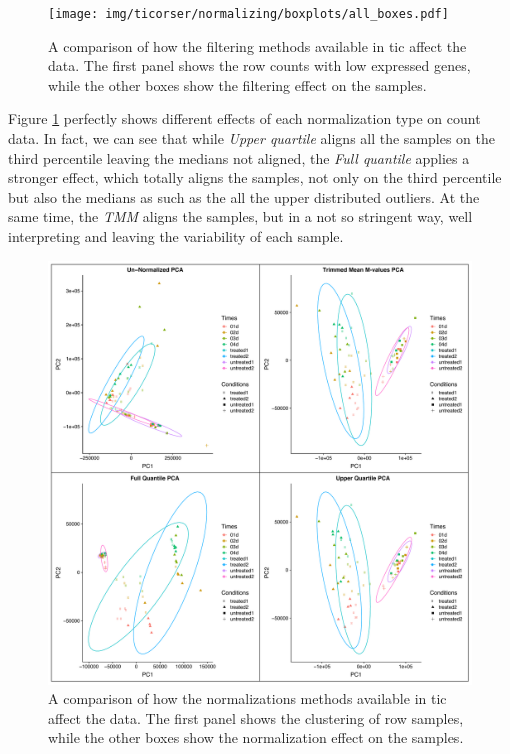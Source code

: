\begin{figure}[H]
\texttt{[image: img/ticorser/normalizing/boxplots/all\_boxes.pdf]}
\caption[ticorser normalizing methods]{A comparison of how the filtering methods available in \gls{tic} affect the data.
The first panel shows the row counts with low expressed genes, while the other boxes show the filtering effect on the samples.}
\label{fig:ticorsernormalizingbox}
\centering
\end{figure}

Figure \ref{fig:ticorsernormalizingbox} perfectly shows different effects of each normalization type on count data.  
In fact, we can see that while \textit{Upper quartile} aligns all the samples on the third percentile leaving the medians not aligned, the \textit{Full quantile} applies a stronger effect, which totally aligns the samples, not only on the third percentile but also the medians as such as the all the upper distributed outliers.
At the same time, the \textit{TMM} aligns the samples, but in a not so stringent way, well interpreting and leaving the variability of each sample.

\begin{figure}[H]
\includegraphics[width=12cm,keepaspectratio]{img/ticorser/normalizing/pca/all_pca.pdf}
\caption[ticorser normalizing methods]{A comparison of how the normalizations methods available in \gls{tic} affect the data.
The first panel shows the clustering of row samples, while the other boxes show the normalization effect on the samples.}
\label{fig:ticorsernormalizingpca}
\centering
\end{figure}


